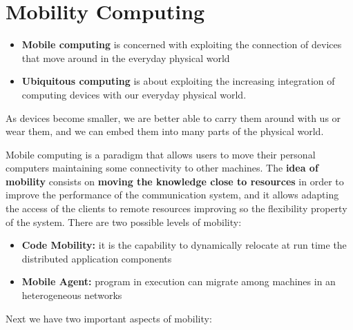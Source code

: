 \chapter{Mobility Computing}
\begin{itemize}
    \item \textbf{Mobile computing} is concerned with exploiting the connection of devices that move around in the everyday physical world
    \item \textbf{Ubiquitous computing} is about exploiting the increasing integration of computing devices with our everyday physical world. 
\end{itemize}
As devices become smaller, we are better able to carry them around with us or wear them, and we can embed them into many parts of the physical world.

Mobile computing is a paradigm that allows users to move their personal computers maintaining some connectivity to other machines. The \textbf{idea of mobility} consists on \textbf{moving the knowledge close to resources} in order to improve the performance of the communication system, and it allows adapting the access of the clients to remote resources improving so the flexibility property of the system. There are two possible levels of mobility:
\begin{itemize}
    \item \textbf{Code Mobility:} it is the capability to dynamically relocate at run time the distributed application components
    \item \textbf{Mobile Agent:} program in execution can migrate among machines in an heterogeneous networks
\end{itemize}
Next we have two important aspects of mobility:
